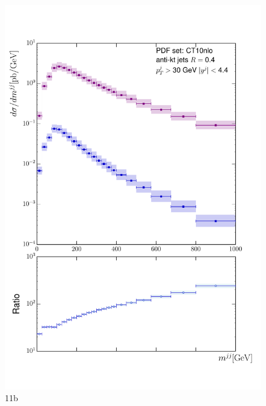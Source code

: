 	\begin{figure}[h]
		\centering
		\includegraphics[width=0.8\linewidth]{Figures/ATLAS_Z_100TeV_11b.pdf}
		\caption{11b}
		\label{fig:emissionsites}
	\end{figure}

